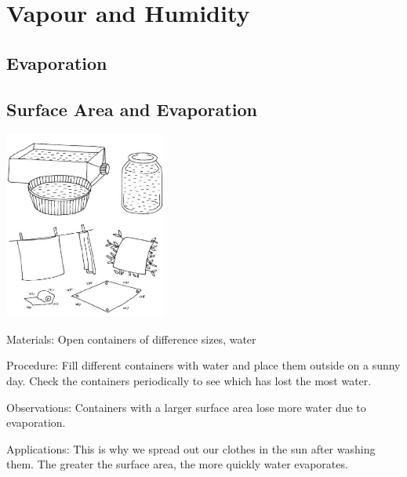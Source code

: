 \section{Vapour and Humidity}

\begin{multicols}{2}


\section*{Evaporation}


\subsection{Surface Area and Evaporation}

\begin{center}
\includegraphics[width=0.4\textwidth]{./img/vso/sa-evaporation.png}
\end{center}

\begin{description*}
\item[Materials:]{Open containers of difference sizes, water}
\item[Procedure:]{Fill different containers with water and place them outside on a sunny day. Check the containers periodically to see which has lost the most water.}
\item[Observations:]{Containers with a larger surface area lose more water due to evaporation.}
\item[Applications:]{This is why we spread out our clothes in the sun after washing them. The greater the surface area, the more quickly water evaporates.}
\end{description*}


\end{multicols}
